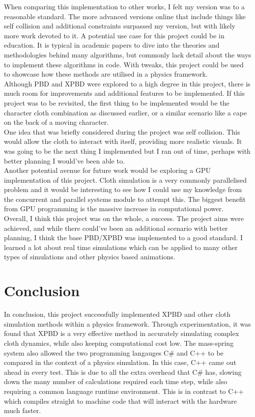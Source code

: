 \documentclass[12pt,a4paper]{article}
\begin{document}
When comparing this implementation to other works, I felt my version was to a reasonable standard. The more advanced versions online that include things like self collision and additional constraints surpassed my version, but with likely more work devoted to it. A potential use case for this project could be in education. It is typical in academic papers to dive into the theories and methodologies behind many algorithms, but commonly lack detail about the ways to implement these algorithms in code. With tweaks, this project could be used to showcase how these methods are utilised in a physics framework. \\

Although PBD and XPBD were explored to a high degree in this project, there is much room for improvements and additional features to be implemented. If this project was to be revisited, the first thing to be implemented would be the character cloth combination as discussed earlier, or a similar scenario like a cape on the back of a moving character. \\
One idea that was briefly considered during the project was self collision. This would allow the cloth to interact with itself, providing more realistic visuals. It was going to be the next thing I implemented but I ran out of time, perhaps with better planning I would've been able to.\\
Another potential avenue for future work would be exploring a GPU implementation of this project. Cloth simulation is a very commonly parallelised problem and it would be interesting to see how I could use my knowledge from the concurrent and parallel systems module to attempt this. The biggest benefit from GPU programming is the massive increase in computational power. \\

Overall, I think this project was on the whole, a success. The project aims were achieved, and while there could've been an additional scenario with better planning, I think the base PBD/XPBD was implemented to a good standard. I learned a lot about real time simulations which can be applied to many other types of simulations and other physics based animations.

\section{Conclusion}
In conclusion, this project successfully implemented XPBD and other cloth simulation methods within a physics framework. Through experimentation, it was found that XPBD is a very effective method in accurately simulating complex cloth dynamics, while also keeping computational cost low. The mass-spring system also allowed the two programming langauges C\# and C++ to be compared in the context of a physics simulation. In this case, C++ came out ahead in every test. This is due to all the extra overhead that C\# has, slowing down the many number of calculations required each time step, while also requiring a common language runtime environment. This is in contrast to C++ which compiles straight to machine code that will interact with the hardware much faster. \\
\end{document}
